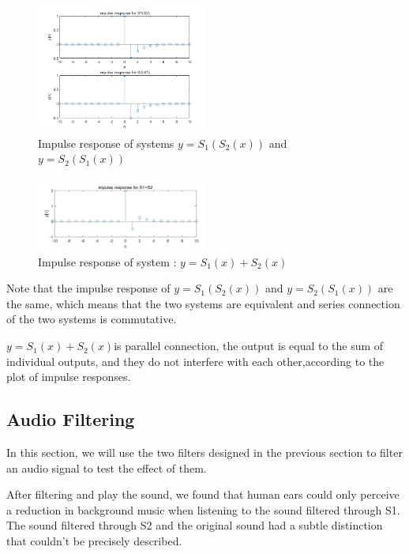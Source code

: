 \documentclass[journal]{IEEEtran}
\begin{document}
\begin{figure}[H]
   \centering
   \includegraphics[width=0.5\textwidth]{2.4.2.png} %
   \caption{Impulse response of systems $y=S_{1}(S_{2}(x))$ and $y=S_{2}(S_{1}(x))$   }
   \label{fig:2.4.2} 
\end{figure}

\begin{figure}[H]
   \centering
   \includegraphics[width=0.5\textwidth]{2.4.3.png} %
   \caption{Impulse response of system : $y=S_{1}(x)+S_{2}(x)$ }
   \label{fig:2.4.3} 
\end{figure}

Note that the impulse response of $y=S_{1}(S_{2}(x))$ and $y=S_{2}(S_{1}(x))$ are the same, which means that the two systems are equivalent and series connection of the two systems is commutative.

$y=S_{1}(x)+S_{2}(x)$is parallel connection, the output is equal to the sum of individual outputs, and they do not interfere with each other,according to the plot of impulse responses.

\subsection{Audio Filtering}
In this section, we will use the two filters designed in the previous section to filter an audio signal to test the effect of them.

After filtering and play the sound, we found that human ears could only perceive a reduction in background music when listening to the sound filtered through S1. The sound filtered through S2 and the original sound had a subtle distinction that couldn't be precisely described.
\end{document}

